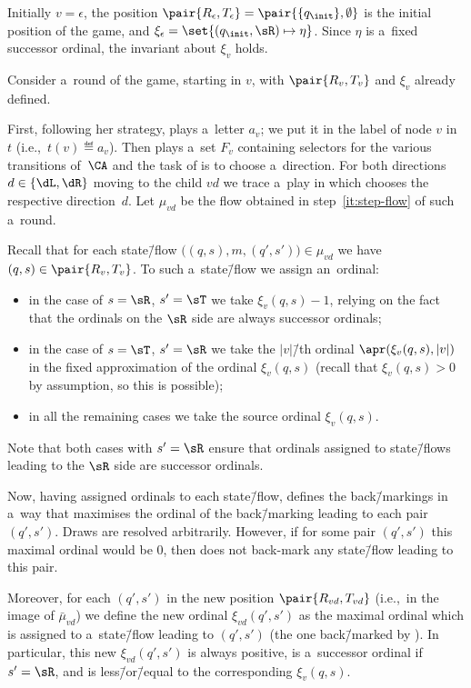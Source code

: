 Initially $v=\epsilon$, the position $\pair{R_\epsilon, T_\epsilon}=\pair{\{q_\init\},\emptyset}$ is the initial position of the game, and $\xi_\epsilon=\set{(q_\init,\sR) \mapsto \eta}$.
Since $\eta$ is a~fixed successor ordinal, the invariant about $\xi_v$ holds.

Consider a~round of the game, starting in $v$, with $\pair{R_v, T_v}$ and $\xi_v$ already defined.

First, following her strategy, \eve plays a~letter $a_v$; we put it in the label of node $v$ in~$t$ (i.e.,~$t(v)\eqdef a_v$).
Then \eve plays a~set $F_v$ containing selectors for the various transitions of~$\CA$ and the task of \adam is to choose a~direction.
For both directions $d\in\{\dL,\dR\}$ moving to the child $vd$ we trace a~play in which \adam chooses the respective direction~$d$.
Let $\mu_{vd}$ be the flow obtained in step~\ref{it:step-flow} of such a~round.

Recall that for each state\=/flow $\big((q,s),m,(q',s')\big)\in\mu_{vd}$ we have $(q,s)\in\pair{R_v,T_v}$.
To such a~state\=/flow we assign an~ordinal:
\begin{itemize}
\item in the case of $s=\sR$, $s'=\sT$ we take $\xi_v(q,s)-1$, relying on the fact that the ordinals on the $\sR$ side are always successor ordinals;
\item in the case of $s=\sT$, $s'=\sR$ we take the $|v|$\=/th ordinal $\apr(\xi_v(q,s),|v|)$ in the fixed approximation of the ordinal $\xi_v(q,s)$ (recall that $\xi_v(q,s)>0$ by assumption, so this is possible);
\item in all the remaining cases we take the source ordinal $\xi_v(q,s)$.
\end{itemize}
\noindent %
Note that both cases with $s'=\sR$ ensure that ordinals assigned to state\=/flows leading to the $\sR$ side are successor ordinals.

Now, having assigned ordinals to each state\=/flow, \adam defines the back\=/markings in a~way that maximises the ordinal of the back\=/marking leading to each pair $(q',s')$.
Draws are resolved arbitrarily.
However, if for some pair $(q',s')$ this maximal ordinal would be $0$, then \adam does not back-mark any state\=/flow leading to this pair.

Moreover, for each $(q',s')$ in the new position $\pair{R_{vd},T_{vd}}$ (i.e.,~in the image of $\bar{\mu}_{vd}$)
we define the new ordinal $\xi_{vd}(q',s')$ as the maximal ordinal which is assigned to a~state\=/flow leading to $(q',s')$ (the one back\=/marked by \adam).
In particular, this new $\xi_{vd}(q',s')$ is always positive, is a~successor ordinal if $s'=\sR$, and is less\=/or\=/equal to the corresponding $\xi_v(q,s)$.

